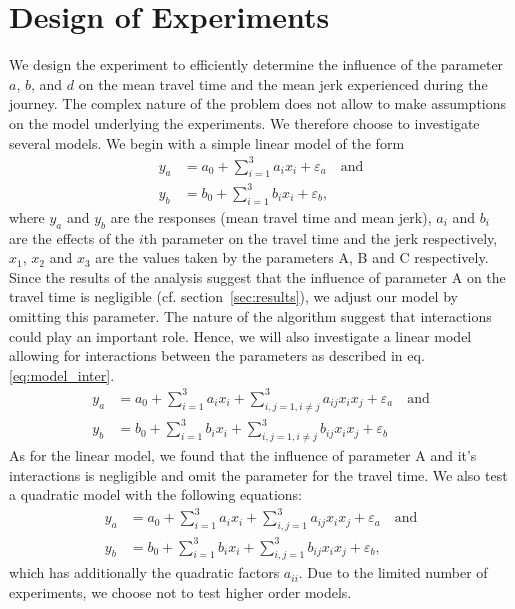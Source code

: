 
\section{Design of Experiments}

We design the experiment to efficiently determine the influence of the  parameter $a$, $b$, and $d$ on the mean travel time and the mean jerk experienced during the journey.
The complex nature of the problem does not allow to make assumptions on the model underlying the experiments. We therefore choose to investigate several models. We begin with a simple linear model of the form
\begin{subequations}\label{eq:model_lin}
\begin{align}
	y_a &= a_0 + \displaystyle\sum_{i=1}^{3} a_i x_i + \varepsilon_a \quad \text{and}\\ 
	y_b &= b_0 + \displaystyle\sum_{i=1}^{3} b_i x_i + \varepsilon_b,
\end{align}
\end{subequations}
where $y_a$ and $y_b$ are the responses (mean travel time and mean jerk), $a_i$ and $b_i$ are the effects of the $i$th parameter on the travel time and the jerk respectively, $x_1$, $x_2$ and $x_3$ are the values taken by the parameters A, B and C respectively. Since the results of the analysis suggest that the influence of parameter A on the travel time is negligible (cf. section~\ref{sec:results}), we adjust our model by omitting this parameter.
The nature of the algorithm suggest that interactions could play an important role. Hence, we will also investigate a linear model allowing for interactions between the parameters as described in eq. \ref{eq:model_inter}.
\begin{subequations}\label{eq:model_inter}
\begin{align}
	y_a &= a_0 + \displaystyle\sum_{i=1}^{3} a_i x_i + \displaystyle\sum_{i,j=1, i \neq j}^{3} a_{ij} x_i x_j + \varepsilon_a \quad \text{and}\\ 
	y_b &= b_0 + \displaystyle\sum_{i=1}^{3} b_i x_i + \displaystyle\sum_{i,j=1, i \neq j}^{3} b_{ij} x_i x_j + \varepsilon_b
\end{align}
\end{subequations}
As for the linear model, we found that the influence of parameter A and it's interactions is negligible and omit the parameter for the travel time. We also test a quadratic model with the following equations:
\begin{subequations}\label{eq:model_quadr}
\begin{align}
	y_a &= a_0 + \displaystyle\sum_{i=1}^{3} a_i x_i + \displaystyle\sum_{i,j=1}^{3} a_{ij} x_i x_j + \varepsilon_a \quad \text{and}\\ 
	y_b &= b_0 + \displaystyle\sum_{i=1}^{3} b_i x_i + \displaystyle\sum_{i,j=1}^{3} b_{ij} x_i x_j + \varepsilon_b,
\end{align}
\end{subequations}
which has additionally the quadratic factors $a_{ii}$.
Due to the limited number of experiments, we choose not to test higher order models.

